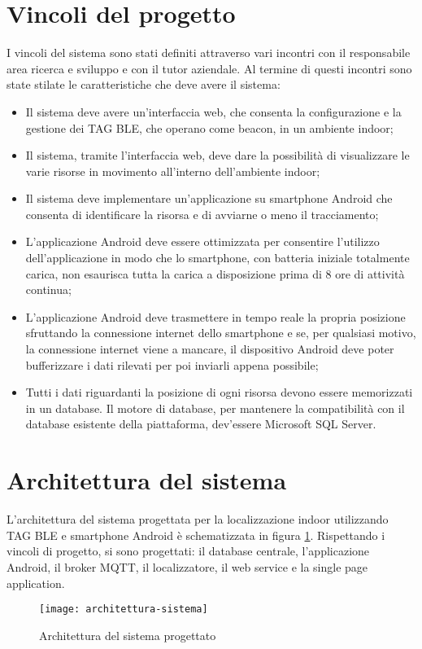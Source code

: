 \section{Vincoli del progetto}
I vincoli del sistema sono stati definiti attraverso vari incontri con il responsabile area ricerca e sviluppo e con il tutor aziendale. Al termine di questi incontri sono state stilate le caratteristiche che deve avere il sistema:
\begin{itemize}
	
	\item Il sistema deve avere un'interfaccia web, che consenta la configurazione e la gestione dei TAG BLE, che operano come beacon, in un ambiente indoor;
	
	\item Il sistema, tramite l'interfaccia web, deve dare la possibilità di visualizzare le varie risorse in movimento all'interno dell'ambiente indoor;
	
	\item Il sistema deve implementare un'applicazione su smartphone Android che consenta di identificare la risorsa e di avviarne o meno il tracciamento;
	
	\item L'applicazione Android deve essere ottimizzata per consentire l'utilizzo dell'applicazione in modo che lo smartphone, con batteria iniziale totalmente carica, non esaurisca tutta la carica a disposizione prima di 8 ore di attività continua;
	
	\item L'applicazione Android deve trasmettere in tempo reale la propria posizione sfruttando la connessione internet dello smartphone e se, per qualsiasi motivo, la connessione internet viene a mancare, il dispositivo Android deve poter bufferizzare i dati rilevati per poi inviarli appena possibile;
	
	\item Tutti i dati riguardanti la posizione di ogni risorsa devono essere memorizzati in un database. Il motore di database, per mantenere la compatibilità con il database esistente della piattaforma, dev'essere Microsoft SQL Server.
	
\end{itemize}

\section{Architettura del sistema}
\label{par:architettura-del-sistema}
L'architettura del sistema progettata per la localizzazione indoor utilizzando TAG BLE e smartphone Android è schematizzata in figura \ref{fig:architettura-sistema}. Rispettando i vincoli di progetto, si sono progettati: il database centrale, l’applicazione Android, il broker MQTT, il localizzatore, il web service e la single page application.

\begin{figure}[htp]
	\centering
	\texttt{[image: architettura-sistema]}
	\caption{Architettura del sistema progettato}
	\label{fig:architettura-sistema}
\end{figure}